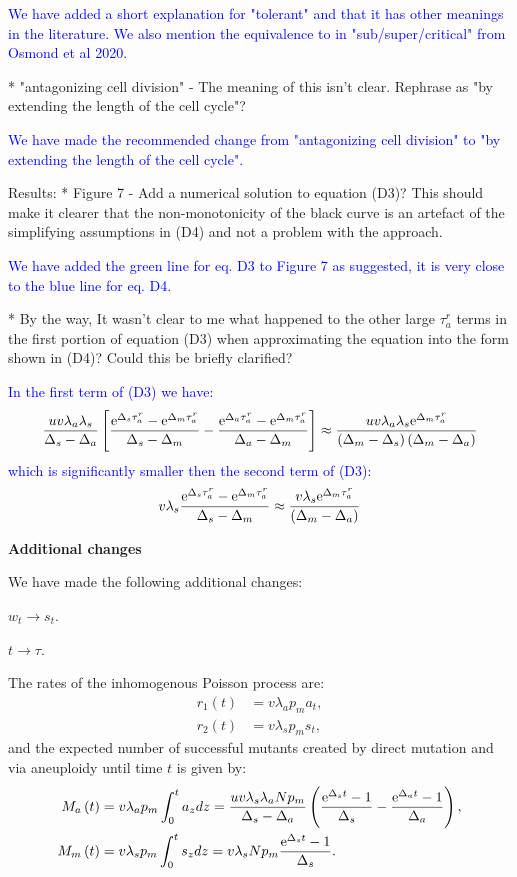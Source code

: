 \documentclass[12pt]{extarticle}
\newcommand{\e}{{\rm e}}
\begin{document}
\textcolor{blue}{We have added a short explanation for "tolerant" and that it has other meanings in the literature. We also mention the equivalence to in "sub/super/critical" from Osmond et al 2020.} %

* "antagonizing cell division" - The meaning of this isn't clear. Rephrase as "by extending the length of the cell cycle"?

\textcolor{blue}{We have made the recommended change from "antagonizing cell division" to "by extending the length of the cell cycle".}  %

Results:
* Figure 7 - Add a numerical solution to equation (D3)? This should make it clearer that the non-monotonicity of the black curve is an artefact of the simplifying assumptions in (D4) and not a problem with the approach.

\textcolor{blue}{We have added the green line for eq. D3 to Figure 7 as suggested, it is very close to the blue line for eq. D4.}

* By the way, It wasn't clear to me what happened to the other large $\tau_a^r$ terms in the first portion of equation (D3) when approximating the equation into the form shown in (D4)? Could this be briefly clarified?

\textcolor{blue}{In the first term of (D3) we have: 
\begin{align*}
\frac{uv\lambda_a\lambda_s}{\Delta_s-\Delta_a}\left[\frac{\e^{\Delta_s\tau_a^r}-\e^{\Delta_m\tau_a^r}}{\Delta_s-\Delta_m}-\frac{\e^{\Delta_a\tau_a^r}-\e^{\Delta_m\tau_a^r}}{\Delta_a-\Delta_m}\right]\approx\frac{uv\lambda_a\lambda_s\e^{\Delta_m\tau_a^r}}{\left(\Delta_m-\Delta_s\right)\left(\Delta_m-\Delta_a\right)}
\end{align*}
which is significantly smaller then the second term of (D3):
\begin{align*}
v\lambda_s\frac{\e^{\Delta_s\tau_a^r}-\e^{\Delta_m\tau_a^r}}{\Delta_s-\Delta_m}\approx\frac{v\lambda_s\e^{\Delta_m\tau_a^r}}{\left(\Delta_m-\Delta_a\right)}
\end{align*}
} %

\textbf{Additional changes}

We have made the following additional changes:

$w_t\rightarrow s_t$. %

$t\rightarrow \tau$. %

The rates of the inhomogenous Poisson process are: %
\begin{align*}
r_1\left(t\right)&=v\lambda_ap_ma_{t},\\ 
r_2\left(t\right)&=v\lambda_sp_ms_{t},
\end{align*}
and the expected number of successful mutants created by direct mutation and via aneuploidy until time $t$ is given by:
\begin{align*}
M_a\left(t\right)&=v\lambda_ap_m\int_0^ta_{z} d z = \frac{uv\lambda_s\lambda_aNp_m}{\Delta_s-\Delta_a}\left(\frac{\e^{\Delta_st}-1}{\Delta_s}-\frac{\e^{\Delta_at}-1}{\Delta_a}\right),\\ 
M_m\left(t\right)&=v\lambda_sp_m\int_0^ts_{z} d z = v\lambda_sNp_m\frac{\e^{\Delta_s t}-1}{\Delta_s}.
\end{align*}
 
\end{document}
